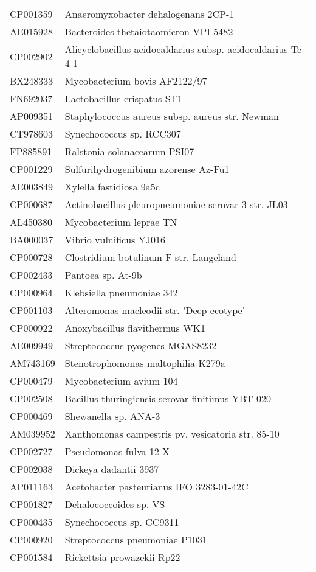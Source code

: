\begin{longtable}{ll}
CP001359 & Anaeromyxobacter dehalogenans 2CP-1\\
AE015928 & Bacteroides thetaiotaomicron VPI-5482\\
CP002902 & Alicyclobacillus acidocaldarius subsp. acidocaldarius Tc-4-1\\
BX248333 & Mycobacterium bovis AF2122/97\\
FN692037 & Lactobacillus crispatus ST1\\
AP009351 & Staphylococcus aureus subsp. aureus str. Newman\\
CT978603 & Synechococcus sp. RCC307\\
FP885891 & Ralstonia solanacearum PSI07\\
CP001229 & Sulfurihydrogenibium azorense Az-Fu1\\
AE003849 & Xylella fastidiosa 9a5c\\
CP000687 & Actinobacillus pleuropneumoniae serovar 3 str. JL03\\
AL450380 & Mycobacterium leprae TN\\
BA000037 & Vibrio vulnificus YJ016\\
CP000728 & Clostridium botulinum F str. Langeland\\
CP002433 & Pantoea sp. At-9b\\
CP000964 & Klebsiella pneumoniae 342\\
CP001103 & Alteromonas macleodii str. 'Deep ecotype'\\
CP000922 & Anoxybacillus flavithermus WK1\\
AE009949 & Streptococcus pyogenes MGAS8232\\
AM743169 & Stenotrophomonas maltophilia K279a\\
CP000479 & Mycobacterium avium 104\\
CP002508 & Bacillus thuringiensis serovar finitimus YBT-020\\
CP000469 & Shewanella sp. ANA-3\\
AM039952 & Xanthomonas campestris pv. vesicatoria str. 85-10\\
CP002727 & Pseudomonas fulva 12-X\\
CP002038 & Dickeya dadantii 3937\\
AP011163 & Acetobacter pasteurianus IFO 3283-01-42C\\
CP001827 & Dehalococcoides sp. VS\\
CP000435 & Synechococcus sp. CC9311\\
CP000920 & Streptococcus pneumoniae P1031\\
CP001584 & Rickettsia prowazekii Rp22\\

\end{longtable}

